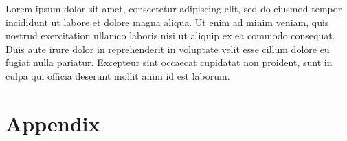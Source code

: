 \documentclass[12pt,a4paper]{article}
\begin{document}
Lorem ipsum dolor sit amet, consectetur adipiscing elit, sed do eiusmod
tempor incididunt ut labore et dolore magna aliqua. Ut enim ad minim
veniam, quis nostrud exercitation ullamco laboris nisi ut aliquip ex ea
commodo consequat. Duis aute irure dolor in reprehenderit in voluptate
velit esse cillum dolore eu fugiat nulla pariatur. Excepteur sint
occaecat cupidatat non proident, sunt in culpa qui officia deserunt
mollit anim id est laborum.

\newpage





\newpage



\hypertarget{appendix}{%
\section*{Appendix}\label{appendix}}
\end{document}
